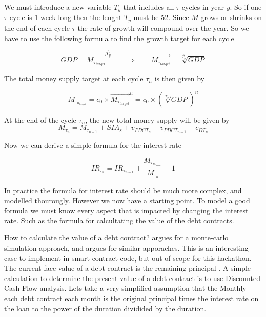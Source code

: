 We must introduce a new variable $T_{y}$ that includes all $\tau$ cycles in year $y$. So if one $\tau$ cycle is 1 week long then the lenght $\overline{T_{y}}$ must be 52. Since $M$ grows or shrinks on the end of each cycle $\tau$ the rate of growth will compound over the year. So we have to use the following formula to find the growth target for each cycle

\begin{equation}
    GDP = \overrightarrow{M_{\tau_{target}}}^{\overline{T_{y}}} \qquad \Rightarrow \qquad \overrightarrow{M_{\tau_{target}}} = \sqrt[\overline{T_{y}}]{GDP}
\end{equation}

The total money supply target at each cycle $\tau_{n}$ is then given by

\begin{equation}
    M_{\tau_{n_{target}}} = c_{0} \times \overrightarrow{M_{\tau_{target}}}^{n} = c_{0} \times (\sqrt[\overline{T_{y}}]{GDP})^n 
\end{equation}

At the end of the cycle $\tau_{n}$, the new total money supply will be given by
\begin{equation}
    M_{\tau_{n}} = M_{\tau_{n-1}} + SIA_{s} + v_{PDCT_{n}} - v_{PDCT_{n-1}} - c_{DT_{n}}
\end{equation}

Now we can derive a simple formula for the interest rate

\begin{equation}
    IR_{\tau_{n}} = IR_{\tau_{n-1}} + \frac{M_{\tau_{n_{target}}}}{M_{\tau_{n}}} - 1
\end{equation}

In practice the formula for interest rate should be much more complex, and modelled thourougly. However we now have a starting point. To model a good formula we must know every aspect that is impacted by changing the interest rate. Such as the formula for calcultating the value of the debt contracts.


How to calculate the value of a debt contract? \textcite{fabozzi2008introduction} argues for a monte-carlo simulation approach, and \textcite{tang2015valuation} argues for similar apporaches. This is an interesting case to implement in smart contract code, but out of scope for this hackathon. The current face value of a debt contract is the remaining principal \cite{FaceValueMBS}. A simple calculation to determine the present value of a debt contract is to use Discounted Cash Flow analysis. Lets take a very simplified assumption that the Monthly each debt contract each month is the original principal times the interest rate on the loan to the power of the duration dividided by the duration. 

